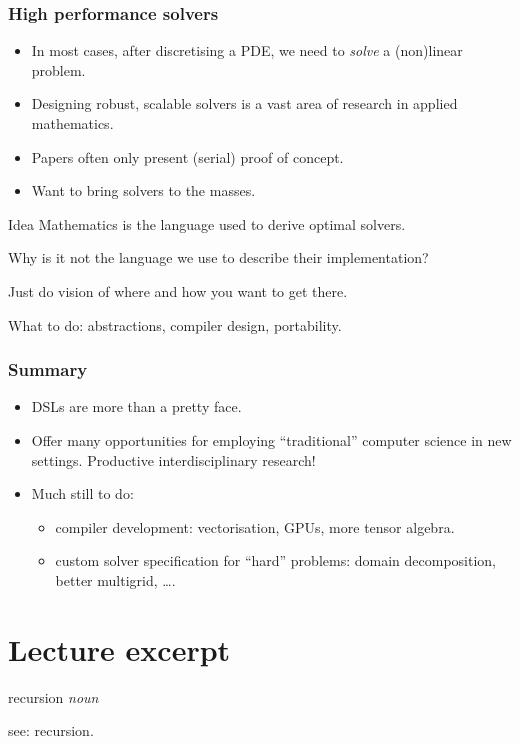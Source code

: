 \documentclass[presentation]{beamer}
\begin{document}
\begin{frame}
  \frametitle{High performance solvers}
  \begin{itemize}
  \item In most cases, after discretising a PDE, we need to
    \emph{solve} a (non)linear problem.
  \item Designing robust, scalable solvers is a vast area of research
    in applied mathematics.
  \item Papers often only present (serial) proof of concept.
  \item Want to bring solvers to the masses.
  \end{itemize}
  \begin{block}{Idea}
    Mathematics is the language used to derive optimal solvers.

    Why is it not the language we use to describe their implementation?
  \end{block}

  Just do vision of where and how you want to get there.

  What to do: abstractions, compiler design, portability.
\end{frame}


\begin{frame}
  \frametitle{Summary}
  \begin{itemize}
  \item DSLs are more than a pretty face.
  \item Offer many opportunities for employing ``traditional''
    computer science in new settings.  Productive interdisciplinary
    research!
  \item Much still to do:
    \begin{itemize}
    \item compiler development: vectorisation, GPUs, more tensor
      algebra.
    \item custom solver specification for ``hard'' problems: domain
      decomposition, better multigrid, \ldots.
    \end{itemize}
  \end{itemize}
\end{frame}

\section{Lecture excerpt}

\begin{frame}
  \begin{definition}
    recursion \emph{noun}

    see: recursion.
  \end{definition}
\end{frame}
\end{document}
